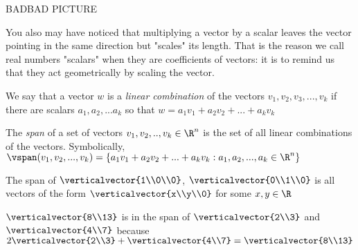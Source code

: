   		BADBAD PICTURE
  		
  		You also may have noticed that multiplying a vector by a scalar leaves the vector pointing in the same direction but "scales" its length.  That is the reason we call real
  		numbers  "scalars" when they are coefficients of vectors:  it is to remind us that they act geometrically by scaling the vector.
  		
  		\begin{definition}
  			We say that a vector $w$ is a \textit{linear combination} of the vectors $v_1,v_2,v_3,...,v_k$ if there are scalars $a_1,a_2,...a_k$ 
  			so that $w = a_1v_1+a_2v_2+...+a_kv_k$
  		\end{definition}
  		
  		\begin{definition}
  			The \textit{span} of a set of vectors $v_1,v_2, ..,v_k \in \R^n$ is the set of all linear combinations of the vectors.
  			Symbolically, $\vspan(v_1,v_2,...,v_k) = \{ a_1v_1+a_2v_2+...+a_kv_k : a_1,a_2, ...,a_k \in \R^n\}$
  		\end{definition}
  		
  		\begin{example}
  			The span of $\verticalvector{1\\0\\0}$, $\verticalvector{0\\1\\0}$ is all vectors of the form $\verticalvector{x\\y\\0}$ for some $x,y \in \R$
  		\end{example}
  		
  		\begin{example}
  			$\verticalvector{8\\13}$ is in the span of $\verticalvector{2\\3}$ and $\verticalvector{4\\7}$ because
  			 $2\verticalvector{2\\3} + \verticalvector{4\\7} = \verticalvector{8\\13}$ 
  		\end{example}
  		
